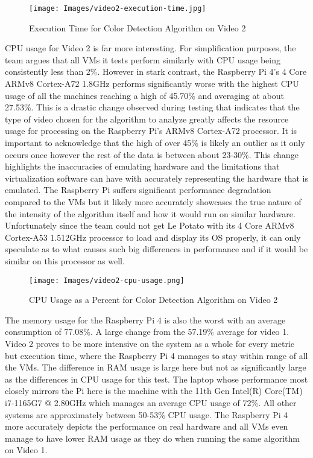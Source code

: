 \begin{figure}
    \centering
    \texttt{[image: Images/video2-execution-time.jpg]}
    \caption{Execution Time for Color Detection Algorithm on Video 2 }
\end{figure}

CPU usage for Video 2 is far more interesting. For simplification
purposes, the team argues that all VMs it tests perform similarly with CPU
usage being consistently less than 2\%. However in stark contrast, the
Raspberry Pi 4's 4 Core ARMv8 Cortex-A72 1.8GHz performs significantly
worse with the highest CPU usage of all the machines reaching a high of
45.70\% and averaging at about 27.53\%. This is a drastic change
observed during testing that indicates that the type of video
chosen for the algorithm to analyze greatly affects the resource usage
for processing on the Raspberry Pi's ARMv8 Cortex-A72 processor. It is
important to acknowledge that the high of over 45\% is likely an outlier
as it only occurs once however the rest of the data is between about
23-30\%. This change highlights the inaccuracies of emulating hardware
and the limitations that virtualization software can have with
accurately representing the hardware that is emulated. The
Raspberry Pi suffers significant performance degradation compared to
the VMs but it likely more accurately showcases the true nature of the
intensity of the algorithm itself and how it would run on similar
hardware. Unfortunately since the team could not get Le Potato with its 4
Core ARMv8 Cortex-A53 1.512GHz processor to load and display its OS
properly, it can only speculate as to what causes such big differences
in performance and if it would be similar on this processor as well.

\begin{figure}
    \centering
    \texttt{[image: Images/video2-cpu-usage.png]}
    \caption{CPU Usage as a Percent for Color Detection Algorithm on Video 2}
\end{figure}

The memory usage for the Raspberry Pi 4 is also the worst with an
average consumption of 77.08\%. A large change from the 57.19\% average
for video 1. Video 2 proves to be more intensive on the system as a
whole for every metric but execution time, where the Raspberry Pi 4
manages to stay within range of all the VMs. The difference in RAM usage
is large here but not as significantly large as the differences in CPU
usage for this test. The laptop whose performance most closely mirrors
the Pi here is the machine with the 11th Gen Intel(R) Core(TM) i7-1165G7
@ 2.80GHz which manages an average CPU usage of 72\%. All other systems
are approximately between 50-53\% CPU usage. The Raspberry Pi 4 more
accurately depicts the performance on real hardware and all VMs even
manage to have lower RAM usage as they do when running the same
algorithm on Video 1.


